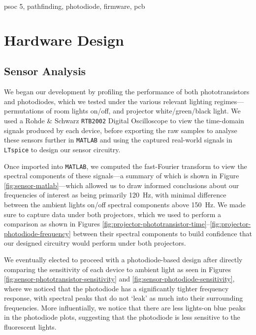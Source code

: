 \documentclass[conference]{IEEEtran}
\begin{document}
\begin{IEEEkeywords}
	psoc 5, pathfinding, photodiode, firmware, pcb
\end{IEEEkeywords}



\section{Hardware Design}

\subsection{Sensor Analysis}

We began our development by profiling the performance of both phototransistors and photodiodes, which we tested under the various relevant lighting regimes—permutations of room lights on/off, and projector white/green/black light.
We used a Rohde \& Schwarz \texttt{RTB2002} Digital Oscilloscope to view the time-domain signals produced by each device, before exporting the raw samples to analyse these sensors further in \texttt{MATLAB} and using the captured real-world signals in \texttt{LTspice} to design our sensor circuitry.

Once imported into \texttt{MATLAB}, we computed the fast-Fourier transform to view the spectral components of these signals—a summary of which is shown in Figure \ref{fig:sensor-matlab}—which allowed us to draw informed conclusions about our frequencies of interest as being primarily \qty{120}{\hertz}, with minimal difference between the ambient lights on/off spectral components above \qty{150}{\hertz}.
We made sure to capture data under both projectors, which we used to perform a comparison as shown in Figures \ref{fig:projector-phototransistor-time}–\ref{fig:projector-photodiode-frequency} between their spectral components to build confidence that our designed circuitry would perform under both projectors.

We eventually elected to proceed with a photodiode-based design after directly comparing the sensitivity of each device to ambient light as seen in Figures \ref{fig:sensor-phototransistor-sensitivity} and \ref{fig:sensor-photodiode-sensitivity}, where we noticed that the photodiode has a significantly tighter frequency response, with spectral peaks that do not `leak' as much into their surrounding frequencies.
More influentially, we notice that there are less lights-on blue peaks in the photodiode plots, suggesting that the photodiode is less sensitive to the fluorescent lights.
\end{document}
